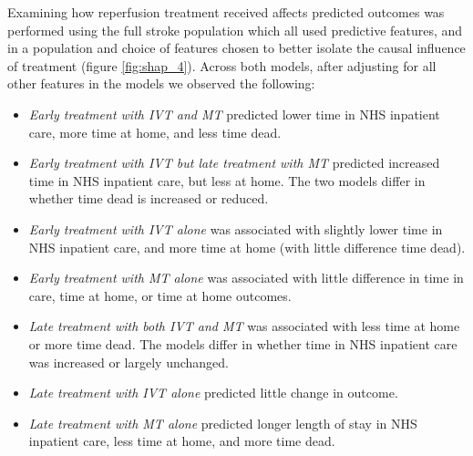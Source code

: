 Examining how reperfusion treatment received affects predicted outcomes was performed using the full stroke population which all used predictive features, and in a population and choice of features chosen to better isolate the causal influence of treatment (figure \ref{fig:shap_4}). Across both models, after adjusting for all other features in the models we observed the following:

\begin{itemize}
    \item \textit{Early treatment with IVT and MT} predicted lower time in NHS inpatient care, more time at home, and less time dead.

    \item \textit{Early treatment with IVT but late treatment with MT} predicted increased time in NHS inpatient care, but less at home. The two models differ in whether time dead is increased or reduced.

    \item \textit{Early treatment with IVT alone} was associated with slightly lower time in NHS inpatient care, and more time at home (with little difference time dead).

     \item \textit{Early treatment with MT alone} was associated with little difference in time in care, time at home, or time at home outcomes.

     \item \textit{Late treatment with both IVT and MT} was associated with less time at home or more time dead. The models differ in whether time in NHS inpatient care was increased or largely unchanged.

     \item \textit{Late treatment with IVT alone} predicted little change in outcome.

     \item \textit{Late treatment with MT alone} predicted longer length of stay in NHS inpatient care, less time at home, and more time dead.     
    
\end{itemize}


